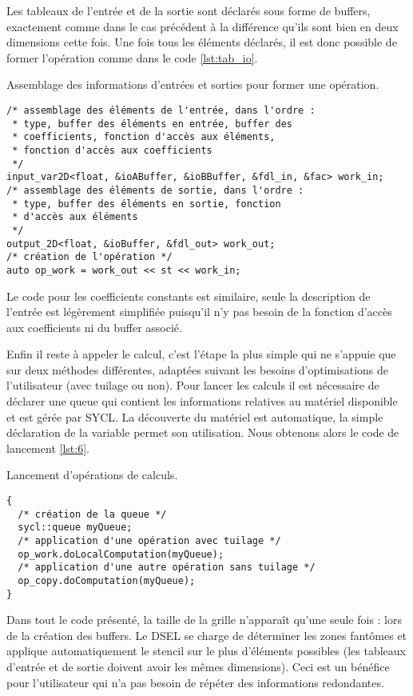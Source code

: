 Les tableaux de l'entrée et de la sortie sont déclarés sous forme de buffers, exactement comme dans le cas précédent à la différence qu'ils sont bien en deux dimensions cette fois. Une fois tous les éléments déclarés, il est donc possible de former l'opération comme dans le code \ref{lst:tab_io}.
\begin{listing}[H]
\caption{Assemblage des informations d'entrées et sorties pour former une opération.}
\label{lst:tab_io}
\begin{verbatim}
/* assemblage des éléments de l'entrée, dans l'ordre :
 * type, buffer des éléments en entrée, buffer des 
 * coefficients, fonction d'accès aux éléments,
 * fonction d'accès aux coefficients
 */
input_var2D<float, &ioABuffer, &ioBBuffer, &fdl_in, &fac> work_in;
/* assemblage des éléments de sortie, dans l'ordre :
 * type, buffer des éléments en sortie, fonction
 * d'accès aux éléments
 */
output_2D<float, &ioBuffer, &fdl_out> work_out;
/* création de l'opération */
auto op_work = work_out << st << work_in;
\end{verbatim}
\end{listing}
Le code pour les coefficients constants est similaire, seule la description de l'entrée est légèrement simplifiée puisqu'il n'y pas besoin de la fonction d'accès aux coefficients ni du buffer associé. 

Enfin il reste à appeler le calcul, c'est l'étape la plus simple qui ne s'appuie que sur deux méthodes différentes, adaptées suivant les besoins d'optimisations de l'utilisateur (avec tuilage ou non). Pour lancer les calculs il est nécessaire de déclarer une queue qui contient les informations relatives au matériel disponible et est gérée par \textsf{SYCL}. La découverte du matériel est automatique, la simple déclaration de la variable permet son utilisation. Nous obtenons alors le code de lancement \ref{lst:6}.
\begin{listing}[H]
\caption{Lancement d'opérations de calculs.}
\label{lst:6}
\begin{verbatim}
{   
  /* création de la queue */
  sycl::queue myQueue; 
  /* application d'une opération avec tuilage */
  op_work.doLocalComputation(myQueue);
  /* application d'une autre opération sans tuilage */
  op_copy.doComputation(myQueue);
}
\end{verbatim}
\end{listing}

Dans tout le code présenté, la taille de la grille n'apparaît qu'une seule fois : lors de la création des buffers. Le DSEL se charge de déterminer les zones fantômes et applique automatiquement le stencil sur le plus d'éléments possibles (les tableaux d'entrée et de sortie doivent avoir les mêmes dimensions). Ceci est un bénéfice pour l'utilisateur qui n'a pas besoin de répéter des informations redondantes. %

